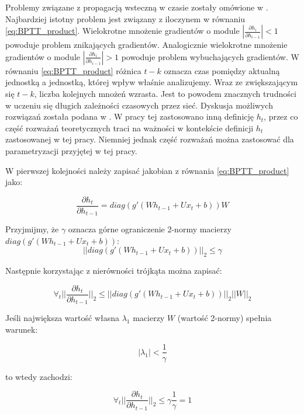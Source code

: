 \documentclass[oneside, mag]{mgr}
\begin{document}
Problemy związane z propagacją wsteczną w czasie zostały omówione w \cite{DBLP:journals/corr/abs-1211-5063}. Najbardziej istotny problem jest związany z iloczynem w równaniu \ref{eq:BPTT_product}. Wielokrotne mnożenie gradientów o module $|\frac{\partial h_i}{\partial h_{i-1}}| < 1$ powoduje problem znikających gradientów. Analogicznie wielokrotne mnożenie gradientów o module $|\frac{\partial h_i}{\partial h_{i-1}}| > 1$ powoduje problem wybuchających gradientów. W równaniu \ref{eq:BPTT_product} różnica $t - k$ oznacza czas pomiędzy aktualną jednostką a jednostką, której wpływ właśnie analizujemy. Wraz ze zwiększającym się $t - k$, liczba kolejnych mnożeń wzrasta. Jest to powodem znacznych trudności w uczeniu się długich zależności czasowych przez sieć.  Dyskusja możliwych rozwiązań została podana w \cite{DBLP:journals/corr/abs-1211-5063}. W pracy tej zastosowano inną definicję $h_t$, przez co część rozważań teoretycznych traci na ważności w kontekście definicji $h_t$ zastosowanej w tej pracy. Niemniej jednak część rozważań można zastosować dla parametryzacji przyjętej w tej pracy.

W pierwszej kolejności należy zapisać jakobian z równania \ref{eq:BPTT_product} jako:

\begin{equation}
	\frac{\partial h_t}{\partial h_{t-1}} = diag(g'(W h_{t-1} + Ux_{t} + b)) W
\end{equation}

Przyjmijmy, że $\gamma$ oznacza górne ograniczenie 2-normy macierzy $diag(g'(W h_{t-1} + Ux_{t} + b))$:
\begin{equation}
	||diag(g'(W h_{t-1} + Ux_{t} + b))||_2 \leq \gamma
\end{equation}

Następnie korzystając z nierówności trójkąta można zapisać:

\begin{equation}
	\forall_{t} ||\frac{\partial h_{t}}{\partial h_{t-1}}||_2 \leq ||diag(g'(W h_{t-1} + Ux_{t} + b))||_2 ||W||_2 
\end{equation}

Jeśli największa wartość własna $\lambda_{1}$ macierzy $W$ (wartość 2-normy) spełnia warunek:

\begin{equation}
	|\lambda_{1}| < \frac{1}{\gamma}
\end{equation}

to wtedy zachodzi:

\begin{equation}
	\forall_{t} ||\frac{\partial h_{t}}{\partial h_{t-1}}||_2 \leq \gamma \frac{1}{\gamma} = 1
\end{equation}
\end{document}
